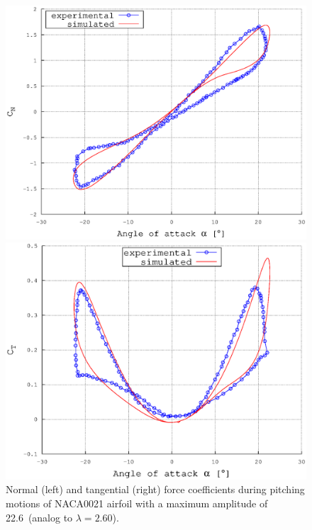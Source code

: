 \documentclass[a4paper]{jpconf}
\begin{document}
\begin{figure}[h]
\begin{minipage}{18pc}
\includegraphics[width=\columnwidth]{CN226.eps}
\end{minipage}\hspace{2pc}%
\begin{minipage}{18pc}
\includegraphics[width=\columnwidth]{CT226.eps}
\end{minipage} 
\caption{\label{fig226}Normal (left) and tangential (right) force coefficients during pitching motions of NACA0021 airfoil with a maximum amplitude of 22.6\degree\ (analog to $\lambda = 2.60$).}
\end{figure}
\end{document}
